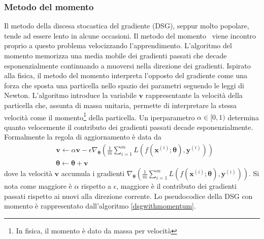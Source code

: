 \documentclass[12pt,a4paper]{report}
\begin{document}
    \subsubsection{Metodo del momento}
    Il metodo della discesa stocastica del gradiente (DSG), seppur molto
    popolare, tende ad essere lento in alcune occasioni. Il metodo del
    momento~\cite{momentum} viene incontro proprio a 
    questo problema velocizzando l'apprendimento. L'algoritmo del 
    momento memorizza una media mobile dei gradienti passati che decade
    esponenzialmente continuando a muoversi nella direzione dei 
    gradienti. Ispirato alla fisica, il metodo del momento interpreta 
    l'opposto del gradiente come una forza che sposta una particella
    nello spazio dei parametri seguendo le leggi di Newton. L'algoritmo 
    introduce la variabile $\boldsymbol{v}$ rappresentante la velocit\`a
    della particella che, assunta di massa unitaria, permette di 
    interpretare la stessa velocit\`a come il momento\footnote{In fisica, 
    il momento \`e dato da massa per velocit\`a} della particella.
    Un iperparametro $\alpha\in[0,1)$ determina quanto velocemente il 
    contributo dei gradienti passati decade esponenzialmente. 
    Formalmente la regola di aggiornamento \`e data da
    \begin{align}
        &\boldsymbol{v}\leftarrow\alpha\boldsymbol{v}-
        \epsilon\nabla_{\boldsymbol{\theta}}\left(\frac{1}{m}\sum\limits_{i=1}^m 
        L(f(\boldsymbol{x}^{(i)}; \boldsymbol{\theta}), \boldsymbol{y}^{(i)})\right) \\
        &\boldsymbol{\theta}\leftarrow\boldsymbol{\theta}+\boldsymbol{v}
    \end{align}
    dove la velocit\`a $\boldsymbol{v}$ accumula i gradienti 
    $\nabla_{\boldsymbol{\theta}}(\frac{1}{m}\sum_{i=1}^m L(f(\boldsymbol{x}^{(i)}; 
    \boldsymbol{\theta}), \boldsymbol{y}^{(i)}))$. 
    Si nota come maggiore \`e $\alpha$ rispetto a $\epsilon$, maggiore 
    \`e il contributo dei gradienti passati rispetto ai nuovi alla 
    direzione corrente. Lo pseudocodice della DSG con momento \`e 
    rappresentato dall'algoritmo \ref{dsgwithmomentum}. 
    
\end{document}
